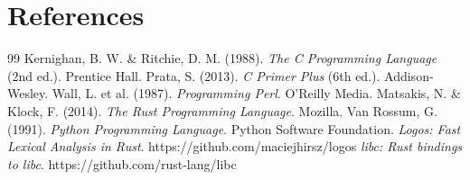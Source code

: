 \documentclass[11pt,a4paper]{article}
\begin{document}



























\clearpage
{}
\section*{\textcolor{darkpurple}{References}}
\begin{thebibliography}{99}
 Kernighan, B. W. \& Ritchie, D. M. (1988). \textit{The C Programming Language} (2nd ed.). Prentice Hall.
 Prata, S. (2013). \textit{C Primer Plus} (6th ed.). Addison-Wesley.
 Wall, L. et al. (1987). \textit{Programming Perl}. O'Reilly Media.
 Matsakis, N. \& Klock, F. (2014). \textit{The Rust Programming Language}. Mozilla.
 Van Rossum, G. (1991). \textit{Python Programming Language}. Python Software Foundation.
 \textit{Logos: Fast Lexical Analysis in Rust}. https://github.com/maciejhirsz/logos
 \textit{libc: Rust bindings to libc}. https://github.com/rust-lang/libc
\end{thebibliography}
\end{document}

